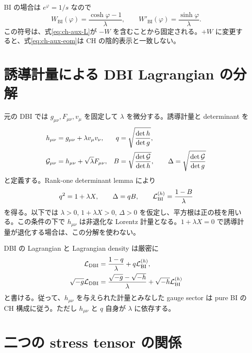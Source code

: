 BI の場合は $e^\varphi=1/s$ なので
\begin{equation}
 W_{\mathrm{BI}}(\varphi)=\frac{\cosh\varphi-1}{\lambda},
 \qquad W'_{\mathrm{BI}}(\varphi)=\frac{\sinh\varphi}{\lambda}.
 \label{eq:ch-bi-potential}
\end{equation}
この符号は、式\eqref{eq:ch-aux-L}が $-W$ を含むことから固定される。$+W$ に変更すると、式\eqref{eq:ch-aux-eom}は CH の陰的表示と一致しない。

\section{誘導計量による DBI Lagrangian の分解}

元の DBI では $g_{\mu\nu},F_{\mu\nu},v_\mu$ を固定して $\lambda$ を微分する。誘導計量と determinant を
\begin{align}
 h_{\mu\nu}&=g_{\mu\nu}+\lambda v_\mu v_\nu,
 &q&=\sqrt{\frac{\det h}{\det g}},\nonumber\\
 \mathcal G_{\mu\nu}&=h_{\mu\nu}+\sqrt\lambda F_{\mu\nu},
 &B&=\sqrt{\frac{\det\mathcal G}{\det h}},\qquad
 \Delta=\sqrt{\frac{\det\mathcal G}{\det g}}
 \label{eq:ch-dbi-decomposition}
\end{align}
と定義する。Rank-one determinant lemma により
\begin{equation}
 q^2=1+\lambda X,
 \qquad\Delta=qB,
 \qquad
 \mathcal L_{\mathrm{BI}}^{(h)}=\frac{1-B}{\lambda}
 \label{eq:ch-qB}
\end{equation}
を得る。以下では $\lambda>0$, $1+\lambda X>0$, $\Delta>0$ を仮定し、平方根は正の枝を用いる。この条件の下で $h_{\mu\nu}$ は非退化な Lorentz 計量となる。$1+\lambda X=0$ で誘導計量が退化する場合は、この分解を使わない。

DBI の Lagrangian と Lagrangian density は厳密に
\begin{align}
 \mathcal L_{\mathrm{DBI}}
 &=\frac{1-q}{\lambda}+q\mathcal L_{\mathrm{BI}}^{(h)},
 \label{eq:ch-dbi-L}\\
 \sqrt{-g}\mathcal L_{\mathrm{DBI}}
 &=\frac{\sqrt{-g}-\sqrt{-h}}{\lambda}
 +\sqrt{-h}\mathcal L_{\mathrm{BI}}^{(h)}
 \label{eq:ch-dbi-density}
\end{align}
と書ける。従って、$h_{\mu\nu}$ を与えられた計量とみなした gauge sector は pure BI の CH 構成に従う。ただし $h_{\mu\nu}$ と $q$ 自身が $\lambda$ に依存する。

\section{二つの stress tensor の関係}

